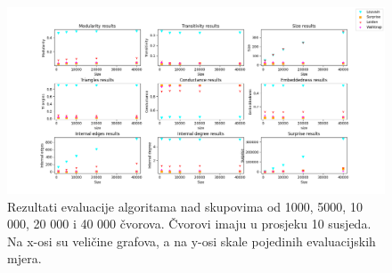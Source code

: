 \begin{figure}[!b]
	\includegraphics[width=\linewidth]{images/test2_10.png}
	\caption{Rezultati evaluacije algoritama nad skupovima od 1000, 5000, 10 000, 20 000 i 40 000 čvorova. Čvorovi imaju u prosjeku 10 susjeda. Na x-osi su veličine grafova, a na y-osi skale pojedinih evaluacijskih mjera.}
	\label{fig:test2_10}
\end{figure}



